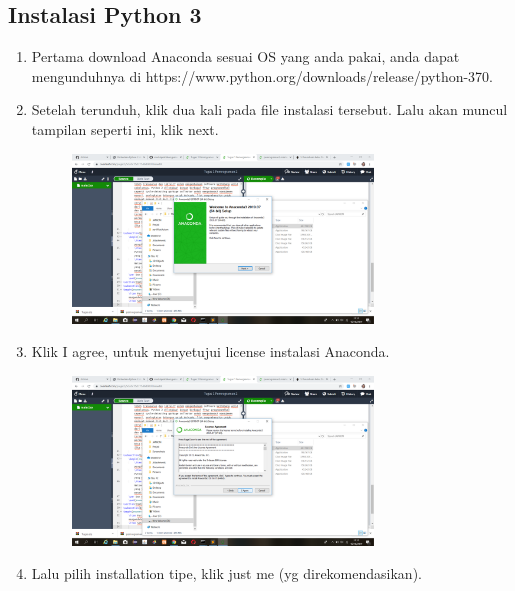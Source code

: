 \documentclass{article}
\begin{document}
\subsection{Instalasi Python 3}
\begin{enumerate}
    \item Pertama download Anaconda sesuai OS yang anda pakai, anda dapat mengunduhnya di https://www.python.org/downloads/release/python-370.
    \item Setelah terunduh, klik dua kali pada file instalasi tersebut. Lalu akan muncul tampilan seperti ini, klik next.
        \begin{figure}[h]
            \centerline{\includegraphics[width=8cm]{image/langkah1.png}}
        \end{figure}
    \item Klik I agree, untuk menyetujui license instalasi Anaconda.
        \begin{figure}[h]
            \centerline{\includegraphics[width=8cm]{image/langkah2.png}}
        \end{figure}
    \item Lalu pilih installation tipe, klik just me (yg direkomendasikan).

\end{enumerate}
\end{document}
